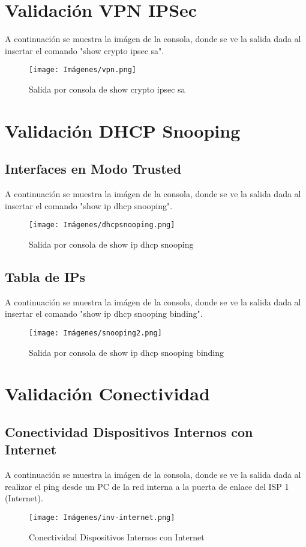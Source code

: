 \section{Validación VPN IPSec}\label{anexo:pruebavpn}
A continuación se muestra la imágen de la consola, donde se ve la salida dada al insertar el comando "show crypto ipsec sa".
\begin{figure}[H]
    \centering
    \texttt{[image: Imágenes/vpn.png]}
    \caption{Salida por consola de show crypto ipsec sa}
\end{figure}

\section{Validación DHCP Snooping}
\subsection{Interfaces en Modo Trusted}\label{anexo:pruebasnoo1}
A continuación se muestra la imágen de la consola, donde se ve la salida dada al insertar el comando "show ip dhcp snooping".
\begin{figure}[H]
    \centering
    \texttt{[image: Imágenes/dhcpsnooping.png]}
    \caption{Salida por consola de show ip dhcp snooping}
\end{figure}

\subsection{Tabla de IPs}\label{anexo:pruebasnoo2}
A continuación se muestra la imágen de la consola, donde se ve la salida dada al insertar el comando "show ip dhcp snooping binding".
\begin{figure}[H]
    \centering
    \texttt{[image: Imágenes/snooping2.png]}
    \caption{Salida por consola de show ip dhcp snooping binding}
\end{figure}

\section{Validación Conectividad}
\subsection{Conectividad Dispositivos Internos con Internet}\label{anexo:pruebaInt-Inter}
A continuación se muestra la imágen de la consola, donde se ve la salida dada al realizar el ping desde un PC de la red interna a la puerta de enlace del ISP 1 (Internet).
\begin{figure}[H]
    \centering
    \texttt{[image: Imágenes/inv-internet.png]}
    \caption{Conectividad Dispositivos Internos con Internet}
\end{figure}

